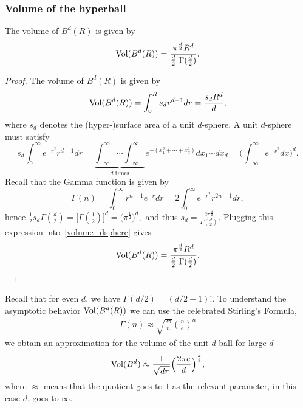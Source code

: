 \subsubsection{Volume of the hyperball}

\begin{proposition}
The volume of $B^d(R)$ is given by
\begin{equation}
\label{volsphere}
\Vol(B^d(R)) = \frac{\pi^{\frac{d}{2}} R^d}{\frac{d}{2}\ \Gamma(\frac{d}{2})}.
\end{equation}
\end{proposition}

\begin{proof}
The volume of $B^{d}(R)$ is given by
\begin{equation}\label{volume_dsphere}
\operatorname{Vol}(B^d(R)) = \int_0^R s_d r^{d-1} dr =  \frac{s_d R^d}{d},
\end{equation}
where $s_d$ denotes the (hyper-)surface area of a unit $d$-sphere. A unit $d$-sphere must satisfy
$$s_d \int_0^{\infty} e^{-r^2} r^{d-1} dr = \underbrace{\int_{-\infty}^{\infty} \cdots \int_{-\infty}^{\infty}}_{\text{$d$ times}} e^{-(x_1^2 + \cdots +x_d^2)}  dx_1 \cdots d x_d = \Big( \int_{-\infty}^{\infty} e^{-x^2} dx \Big)^d.$$
Recall that the Gamma function is given by
$$\Gamma(n) = \int_0^\infty r^{n-1} e^{-r}  dr = 2 \int_0^\infty e^{-r^2} r^{2n-1} dr,$$
hence
$\frac{1}{2} s_d \Gamma(\frac{d}{2}) = \Big[ \Gamma(\frac{1}{2}) \Big]^d = \big( \pi^{\frac{1}{2}}\big)^d,$
and thus
$s_d = \frac{2 \pi^{\frac{d}{2}} }{\Gamma(\frac{d}{2})}.$
Plugging this expression into~\eqref{volume_dsphere} gives
\begin{equation}
\label{volsphere}
\Vol(B^d(R)) = \frac{\pi^{\frac{d}{2}} R^d}{\frac{d}{2}\ \Gamma(\frac{d}{2})}.
\end{equation}
%
\end{proof}

Recall that for even $d$, we have $\Gamma(d/2) = (d/2 - 1)!$. To understand the asymptotic behavior $\operatorname{Vol}(B^d(R))$ we can use the celebrated Stirling's Formula,
\begin{align*}
  \Gamma(n) \approx \sqrt{\frac{2\pi}{n}}\left(\frac{n}{e}\right)^n
\end{align*}
we obtain an approximation for the volume of the unit $d$-ball for large $d$
\begin{align}\label{approxvolume}
  \operatorname{Vol}(B^d) \approx \frac{1}{\sqrt{d\pi}} \Big( \frac{2\pi e}{d} \Big)^{\frac{d}{2}},
\end{align}
where $\approx$ means that the quotient goes to $1$ as the relevant parameter, in this case $d$, goes to $\infty$.

